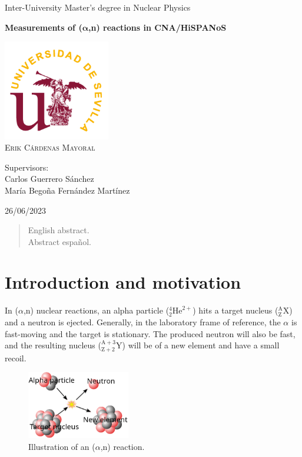 \documentclass[a4paper,12pt]{report}
\newcommand{\an}{($\alpha$,n) }
\begin{document}
\begin{titlepage}
	\centering
	\Huge Inter-University Master's degree in Nuclear Physics\par
	\vspace*{3cm}
	\HUGE \textbf{Measurements of ($\bm{\alpha}$,n) reactions in CNA/HiSPANoS}\par	%
	\vspace{1cm}
	\includegraphics[width=0.35\textwidth]{us.png}\\
	\vspace{1cm}
	\Large \textsc{Erik Cárdenas Mayoral}\par
	\vspace{2cm}
	Supervisors:\\
	Carlos Guerrero Sánchez\\
	María Begoña Fernández Martínez\par
	\vfill
	26/06/2023
\end{titlepage}

\begin{abstract}
English abstract.
\\
Abstract español.
\end{abstract}

\tableofcontents

\chapter{Introduction and motivation}
In \an nuclear reactions, an alpha particle ($^4_2\text{He}^{2+}$) hits a target nucleus ($^\text{A}_\text{Z}\text{X}$) and a neutron is ejected.
Generally, in the laboratory frame of reference, the $\alpha$ is fast-moving and the target is stationary.
The produced neutron will also be fast, and the resulting nucleus ($^{\text{A}+3}_{\text{Z}+2}\text{Y}$) will be of a new element and have a small recoil.

\begin{figure}[H]
	\centering
	\includegraphics[width=0.4\textwidth]{anreaction.png}
	\caption{Illustration of an \an reaction.}
	\label{anreaction}
\end{figure}
\end{document}
